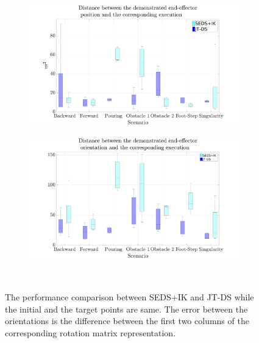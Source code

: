\documentclass{article}
\begin{document}
\begin{enumerate}
\begin{figure}[!t]
\begin{subfigure}[t]{0.63\linewidth}
		\caption{ }
		\label{fig:SEDSvsJTDSO:E}
	\end{subfigure}\\		 
	\hspace*{-2.4cm}\begin{subfigure}[t]{0.63\linewidth}
			\includegraphics[trim={2cm 0.0cm 3.25cm 0cm},clip,width=\textwidth]{Pics/SEDS_JT_P.pdf}
		\caption{ }
			\label{fig:SEDSvsJTDSP}
		\end{subfigure}%
		\begin{subfigure}[t]{0.63\linewidth}
			\includegraphics[trim={2cm 0.0cm 3.25cm 0cm},clip,width=\textwidth]{Pics/SEDS_JT_O.pdf}
			\caption{ }	
			\label{fig:SEDSvsJTDSO}
		\end{subfigure}\\
	\caption{The performance comparison between SEDS+IK and JT-DS while the initial and the target points are same. The error between the orientations is the difference between the first two columns of the corresponding rotation matrix representation.}
	\label{fig:SEDSvsJTDS}
\end{figure}

\end{enumerate}
\end{document}
